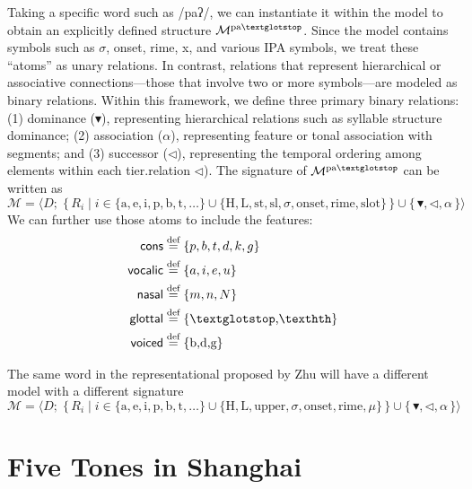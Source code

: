 \documentclass[11pt]{article}
\begin{document}
Taking a specific word such as /paʔ/, we can instantiate it within the model to 
obtain an explicitly defined structure $\mathcal{M}^{\text{pa\textglotstop}}$. 
Since the model contains symbols such as $\sigma$, \textsf{onset}, \textsf{rime}, 
\textsf{x}, and various IPA symbols, we treat these “atoms” as unary relations. In 
contrast, relations that represent hierarchical or associative connections—those 
that involve two or more symbols—are modeled as binary relations. Within this 
framework, we define three primary binary relations: (1) dominance ($\blacktriangledown$), 
representing hierarchical relations such as syllable structure dominance;
(2) association ($\alpha$), representing feature or tonal association with 
segments; and
(3) successor ($\lhd$), representing the temporal ordering among elements within 
each tier.relation $\lhd$). The signature of $\mathcal{M}^{\text{pa\textglotstop}}$ can be written as
\[
\mathcal{M}
= \langle 
D;\;
\{\, R_i \mid i \in 
\{\text{a}, \text{e}, \text{i}, \text{p}, \text{b}, \text{t}, \ldots\}
\cup
\{\text{H}, \text{L}, \text{st}, \text{sl}, \sigma, \text{onset}, \text{rime}, \text{slot}\} \,\}
\cup
\{\,\blacktriangledown, \lhd, \alpha\,\}
\rangle
\]
We can further use those atoms to include the  features:
\begin{align*}
\textsf{cons} &\stackrel{\text{def}}{=} \{p,b,t,d,k,g\}\\
\textsf{vocalic} &\stackrel{\text{def}}{=} \{a,i,e,u\}\\
\textsf{nasal} &\stackrel{\text{def}}{=} \{m,n,N\}\\
\textsf{glottal} &\stackrel{\text{def}}{=} \{\text{\textglotstop,\texthth}\}\\
\textsf{voiced} &\stackrel{\text{def}}{=} \{\text{b,d,g}\}\\
\end{align*}

The same word  in the representational proposed by Zhu will have 
a different model with a different signature
\[
\mathcal{M}
= \langle 
D;\;
\{\, R_i \mid i \in 
\{\text{a}, \text{e}, \text{i}, \text{p}, \text{b}, \text{t}, \ldots\}
\cup
\{\text{H}, \text{L}, \text{upper}, \sigma, \text{onset}, \text{rime}, \mu \} \,\}
\cup
\{\,\blacktriangledown, \lhd, \alpha\,\}
\rangle
\]


\section{Five Tones in Shanghai}
\end{document}
